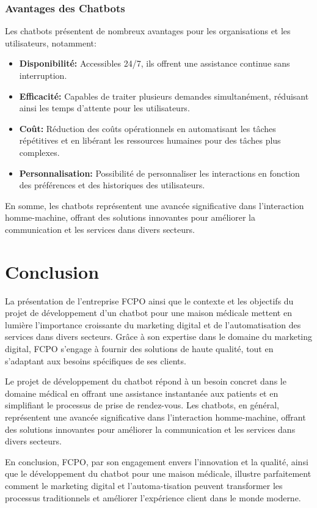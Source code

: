 \subsubsection{Avantages des Chatbots}
\hspace{16pt}Les chatbots présentent de nombreux avantages pour les organisations et les utilisateurs, notamment:

\begin{itemize}
  \item \textbf{Disponibilité: }Accessibles 24/7, ils offrent une assistance continue sans interruption.
  \item \textbf{Efficacité: }Capables de traiter plusieurs demandes simultanément, réduisant ainsi les temps d'attente pour les utilisateurs.
  \item \textbf{Coût: }Réduction des coûts opérationnels en automatisant les tâches répétitives et en libérant les ressources humaines pour des tâches plus complexes.
  \item \textbf{Personnalisation: }Possibilité de personnaliser les interactions en fonction des préférences et des historiques des utilisateurs.
\end{itemize}

En somme, les chatbots représentent une avancée significative dans l'interaction homme-machine, offrant des solutions innovantes pour améliorer la communication et les services dans divers secteurs.




\newpage

\section*{Conclusion}

\hspace{16pt}La présentation de l'entreprise FCPO ainsi que le contexte et les objectifs du projet de développement d'un chatbot pour une maison médicale mettent en lumière l'importance croissante du marketing digital et de l'automatisation des services dans divers secteurs. Grâce à son expertise dans le domaine du marketing digital, FCPO s'engage à fournir des solutions de haute qualité, tout en s'adaptant aux besoins spécifiques de ses clients.

Le projet de développement du chatbot répond à un besoin concret dans le domaine médical en offrant une assistance instantanée aux patients et en simplifiant le processus de prise de rendez-vous. Les chatbots, en général, représentent une avancée significative dans l'interaction homme-machine, offrant des solutions innovantes pour améliorer la communication et les services dans divers secteurs.

En conclusion, FCPO, par son engagement envers l'innovation et la qualité, ainsi que le développement du chatbot pour une maison médicale, illustre parfaitement comment le marketing digital et l'automa-tisation peuvent transformer les processus traditionnels et améliorer l'expérience client dans le monde moderne.
